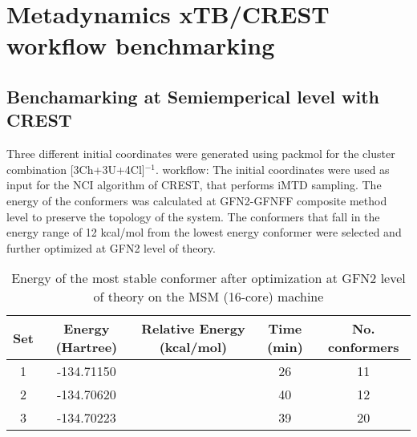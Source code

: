 \section{Metadynamics xTB/CREST workflow benchmarking}
\subsection{Benchamarking at Semiemperical level with CREST}
Three different initial coordinates were generated using packmol for the cluster combination
[3Ch+3U+4Cl]$^{-1}$.
workflow:
The initial coordinates were used as input for the NCI algorithm of CREST, that performs iMTD sampling.
The energy of the conformers was calculated at GFN2-GFNFF composite method level to preserve the topology of the system.
The conformers that fall in the energy range of 12 kcal/mol from the lowest energy conformer were selected and further optimized at GFN2 level of theory.
\begin{table}
\centering
\begin{tabular}{|c|c|c|c|c|} \hline
\textbf{Set} & \textbf{Energy (Hartree)} & \textbf{Relative Energy (kcal/mol)}&\textbf{Time (min)} & \textbf{No. conformers} \\ \hline
1 & -134.71150 & & 26 & 11\\ \hline
2 & -134.70620 & & 40 & 12 \\ \hline
3 & -134.70223 & & 39 & 20\\ \hline
\end{tabular}
\caption{Energy of the most stable conformer after optimization at GFN2 level of theory on the MSM (16-core) machine}
\end{table}
